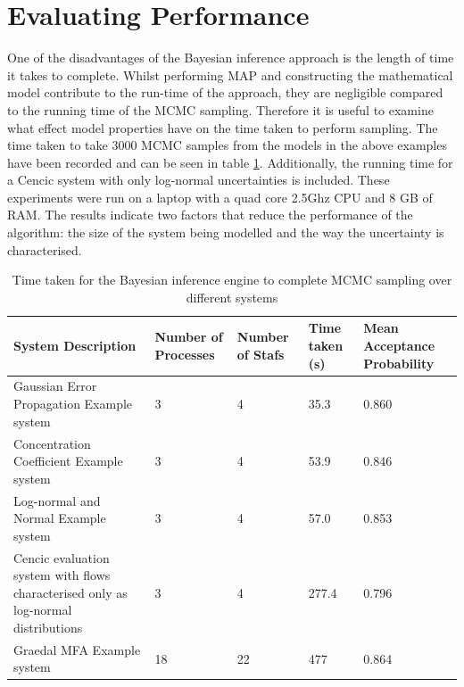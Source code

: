 \documentclass[ %
                    author={Tom Jager},
                supervisor={Dr. Daniel Schien},
                    degree={MEng},
                     title={A Bayesian Inference Engine for Calibrating Uncertainty over UMIS Structured MFA Systems},
                  subtitle={},
                      type={research},
                      year={2019} ]{dissertation}
\begin{document}
\section{Evaluating Performance}
One of the disadvantages of the Bayesian inference approach is the length of time it takes to complete. Whilst performing MAP and constructing the mathematical model contribute to the run-time of the approach, they are negligible compared to the running time of the MCMC sampling. Therefore it is useful to examine what effect model properties have on the time taken to perform sampling. The time taken to take $3000$ MCMC samples from the models in the above examples have been recorded and can be seen in table \ref{table:example_times}. Additionally, the running time for a Cencic system with only log-normal uncertainties is included. These experiments were run on a laptop with a quad core 2.5Ghz CPU and 8 GB of RAM. The results indicate two factors that reduce the performance of the algorithm: the size of the system being modelled and the way the uncertainty is characterised.

\begin{table}[]
\center
\begin{tabular}{|p{4.5cm}|p{2cm}|p{2cm}|l|p{2cm}|}
\hline
\textbf{System Description}                                                         & \textbf{Number of Processes} & \textbf{Number of Stafs} & \textbf{Time taken (s)} & \textbf{Mean \mbox{Acceptance} Probability} \\ \hline
Gaussian Error \mbox{Propagation} Example system                                          & 3                            & 4                        & 35.3                    & 0.860                                \\ \hline
Concentration Coefficient \mbox{Example} system                                           & 3                            & 4                        & 53.9                   & 0.846                                \\ \hline
Log-normal and Normal \mbox{Example} system                                               & 3                            & 4                        & 57.0                      & 0.853                                \\ \hline
Cencic evaluation system with flows characterised only as log-normal distributions & 3                            & 4                        & 277.4                   & 0.796                                \\ \hline
Graedal MFA Example \mbox{system}                                                         & 18                           & 22                       & 477                     & 0.864                                \\ \hline
\end{tabular}
\caption{Time taken for the Bayesian inference engine to complete MCMC sampling over different systems}
\label{table:example_times}
\end{table}
\end{document}

